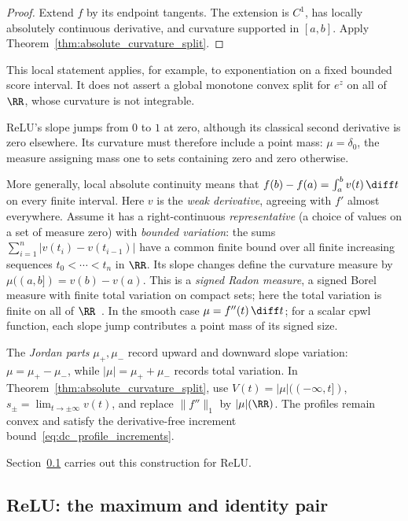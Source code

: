 \begin{proof}
Extend $f$ by its endpoint tangents. The extension is $C^1$, has locally absolutely continuous derivative, and curvature supported in $[a,b]$. Apply Theorem~\ref{thm:absolute_curvature_split}.
\end{proof}

This local statement applies, for example, to exponentiation on a fixed bounded score interval. It does not assert a global monotone convex split for $e^z$ on all of $\RR$, whose curvature is not integrable.

\begin{remark}\label{rem:bv_extension}
ReLU's slope jumps from $0$ to $1$ at zero, although its classical second derivative is zero elsewhere. Its curvature must therefore include a point mass: $\mu=\delta_0$, the measure assigning mass one to sets containing zero and zero otherwise.

More generally, local absolute continuity means that $f(b)-f(a)=\int_a^b v(t)\,\diff t$ on every finite interval. Here $v$ is the \emph{weak derivative}, agreeing with $f'$ almost everywhere. Assume it has a right-continuous \emph{representative} (a choice of values on a set of measure zero) with \emph{bounded variation}: the sums $\sum_{i=1}^n|v(t_i)-v(t_{i-1})|$ have a common finite bound over all finite increasing sequences $t_0<\cdots<t_n$ in $\RR$. Its slope changes define the curvature measure by $\mu((a,b])=v(b)-v(a)$. This is a \emph{signed Radon measure}, a signed Borel measure with finite total variation on compact sets; here the total variation is finite on all of $\RR$~\parencite[Sections~3.A--3.C]{Hunter2014PDE}. In the smooth case $\mu=f''(t)\,\diff t$; for a scalar \ac{cpwl} function, each slope jump contributes a point mass of its signed size.

The \emph{Jordan parts} $\mu_+,\mu_-$ record upward and downward slope variation: $\mu=\mu_+-\mu_-$, while $|\mu|=\mu_++\mu_-$ records total variation. In Theorem~\ref{thm:absolute_curvature_split}, use $V(t)=|\mu|(({-\infty},t])$, $s_\pm=\lim_{t\to\pm\infty}v(t)$, and replace $\|f''\|_1$ by $|\mu|(\RR)$. The profiles remain convex and satisfy the derivative-free increment bound~\eqref{eq:dc_profile_increments}.

Section~\ref{sec:dc_splitting_relu} carries out this construction for ReLU.
\end{remark}

\subsection{ReLU: the maximum and identity pair}\label{sec:dc_splitting_relu}

